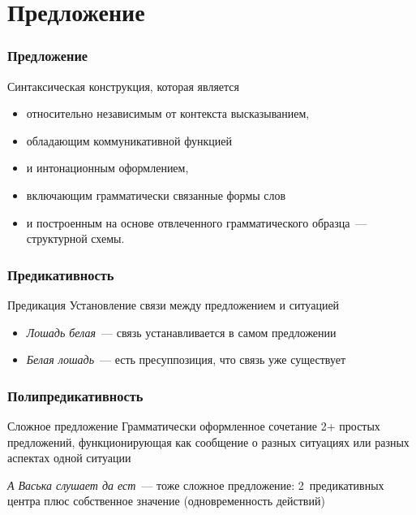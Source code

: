 \section{Предложение}
\frame{\tableofcontents[currentsection]}

\begin{frame}
  \frametitle{Предложение}

  Синтаксическая конструкция, которая является \begin{itemize}
    \item относительно независимым от контекста высказыванием,
    \item обладающим коммуникативной функцией
    \item и интонационным оформлением,
    \item включающим грамматически связанные формы слов
    \item и построенным на основе отвлеченного грамматического образца~--- структурной схемы.
  \end{itemize}
\end{frame}

\begin{frame}
  \frametitle{Предикативность}

  \begin{block}{Предикация}
    Установление связи между предложением и ситуацией
  \end{block}

  \vfill

  \begin{itemize}
    \item \textit{Лошадь белая}~--- связь устанавливается в самом предложении
    \item \textit{Белая лошадь}~--- есть пресуппозиция, что связь уже существует
  \end{itemize}
\end{frame}

\begin{frame}
  \frametitle{Полипредикативность}

  \begin{alertblock}{Сложное предложение}
    Грамматически оформленное сочетание 2+ простых предложений,
    функционирующая как сообщение о разных ситуациях или разных аспектах одной ситуации
  \end{alertblock}

  \textit{А Васька слушает да ест}~--- тоже сложное предложение: 2~предикативных центра плюс собственное значение (одновременность действий)
\end{frame}

